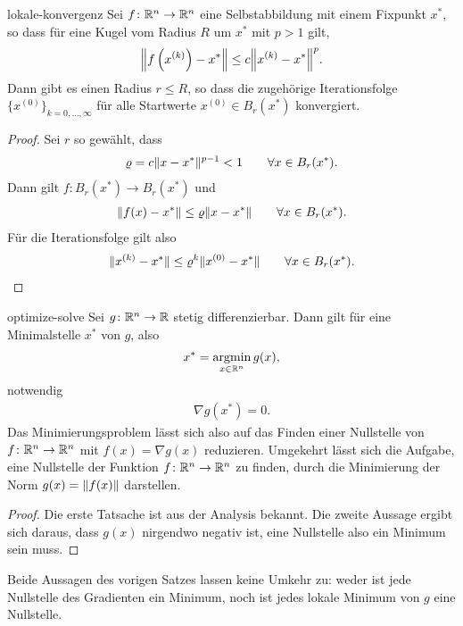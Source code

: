 \begin{Satz}{lokale-konvergenz}
  Sei $f\colon \mathbb R^n\to \mathbb R^n$ eine Selbstabbildung mit einem Fixpunkt
  $x^*$, so dass für eine Kugel vom Radius $R$ um $x^*$ mit $p>1$ gilt,
  \begin{gather}
    \norm*{f\left(x^{(k)}\right) - x^*}
    \le c \norm*{x^{(k)}-x^*}^p.
  \end{gather}
  Dann gibt es einen Radius $r\le R$, so dass die zugehörige
  Iterationsfolge $\{x^{(0)}\}_{k=0,\dots,\infty}$ für alle Startwerte
  $x^{(0)}\in B_r(x^*)$ konvergiert.
\end{Satz}

\begin{proof}
  Sei $r$ so gewählt, dass
  \begin{gather}
    \varrho = c \lVert x-x^*\rVert^{p-1} < 1 \qquad\forall x\in B_r(x^*).
  \end{gather}
  Dann gilt $f\colon  B_r(x^*) \to  B_r(x^*)$ und
  \begin{gather}
    \lVert f(x)-x^*\rVert \le \varrho \lVert x-x^*\rVert \qquad\forall x\in B_r(x^*).
  \end{gather}
  Für die Iterationsfolge gilt also
  \begin{gather}
    \lVert x^{(k)}-x^*\rVert
    \le \varrho^k \lVert x^{(0)}-x^*\rVert
    \qquad\forall x\in B_r(x^*).
  \end{gather} 
\end{proof}

\begin{Satz}{optimize-solve}
  Sei $g\colon \mathbb R^n\to \mathbb R$ stetig differenzierbar. Dann gilt für eine
  Minimalstelle $x^*$ von $g$, also
  \begin{gather}
    x^* = \operatorname*{argmin}_{x\in\mathbb R^n} g(x),
  \end{gather}
  notwendig
  \begin{gather}
    \nabla g(x^*) = 0.
  \end{gather}
  Das Minimierungsproblem lässt sich also auf das Finden einer
  Nullstelle von $f\colon \mathbb R^n\to \mathbb R^n$ mit $f(x) = \nabla g(x)$
  reduzieren. Umgekehrt lässt sich die Aufgabe, eine Nullstelle der
  Funktion $f\colon \mathbb R^n \to \mathbb R^n$ zu finden, durch die Minimierung
  der Norm $g(x) = \lVert f(x)\rVert$ darstellen.
\end{Satz}

\begin{proof}
  Die erste Tatsache ist aus der Analysis bekannt. Die zweite Aussage
  ergibt sich daraus, dass $g(x)$ nirgendwo negativ ist, eine
  Nullstelle also ein Minimum sein muss.
\end{proof}

\begin{remark}
  Beide Aussagen des vorigen Satzes lassen keine Umkehr zu: weder ist
  jede Nullstelle des Gradienten ein Minimum, noch ist jedes lokale
  Minimum von $g$ eine Nullstelle.
\end{remark}


